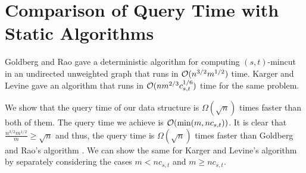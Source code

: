 

\section{Comparison of Query Time with Static Algorithms}
\label{appendix:non-trivial-query-time}
Goldberg and Rao \cite{DBLP:conf/focs/GoldbergR97a} gave a deterministic algorithm for computing $(s,t)$-mincut in an undirected unweighted graph that runs in ${\cal O}(n^{3/2}m^{1/2})$ time. Karger and Levine \cite{DBLP:conf/stoc/KargerL98} gave an algorithm that runs in ${\cal O}(nm^{2/3}c_{s,t}^{1/6})$ time for the same problem. 

We show that the query time of our data structure is ${\Omega}(\sqrt{n})$ times faster than both of them. The query time we achieve is ${\cal O}(\min(m,nc_{s,t}))$.
It is clear that $\frac{n^{3/2}m^{1/2}}{m}\geq \sqrt{n}$ and thus, the query time is $\Omega(\sqrt{n})$ times faster than Goldberg and Rao's algorithm \cite{DBLP:conf/focs/GoldbergR97a}. We can show the same for Karger and Levine's algorithm \cite{DBLP:conf/stoc/KargerL98} by separately considering the cases $m<nc_{s,t}$ and $m\geq nc_{s,t}$.


